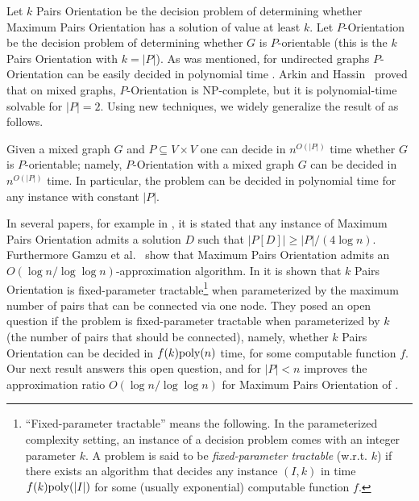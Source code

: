 \documentclass[envcountsame]{llncs}
\begin{document}
\vspace{0.1cm}

Let {\sf $k$ Pairs Orientation} be the decision problem of determining whether 
{\sf Ma\-xi\-mum Pairs Orientation} has a solution of value at least $k$.
Let {\sf $P$-Orientation} be the decision problem of determining whether 
$G$ is $P$-orientable (this is the {\sf $k$ Pairs Orientation} with $k=|P|$).
As was mentioned, for undirected graphs {\sf $P$-Orientation} can be easily decided 
in polynomial time \cite{HM}.
Arkin and Hassin~\cite{H1} proved that on mixed graphs, {\sf $P$-Orientation}
is NP-complete, but it is polynomial-time solvable for $|P|=2$.
Using new techniques, we widely generalize the result of \cite{H1} as follows.

\begin{theorem} \label{t:mix}
Given a mixed graph $G$ and $P \subseteq V \times V$ one can decide in $n^{O(|P|)}$ time
whether $G$ is $P$-orientable;
namely, {\sf $P$-Orientation} with a mixed graph $G$ can be decided in $n^{O(|P|)}$ time.
In particular, the problem can be decided in polynomial time for any instance with constant $|P|$.
\end{theorem}

In several papers, for example in \cite{ZV}, 
it is stated that any instance of {\sf Ma\-xi\-mum Pairs Orientation} 
admits a solution $D$ such that $|P[D]| \geq |P|/(4\log n)$. 
Furthermore Gamzu et al.~\cite{segev-approx} show that
{\sf Maximum Pairs Orientation} admits an $O(\log n/\log\log n)$-approximation algorithm.
In \cite{fpt} it is shown that {\sf $k$ Pairs Orientation} is fixed-parameter 
tractable\footnote{``Fixed-parameter tractable'' means the following. 
In the parameterized complexity setting, an instance of a decision problem 
comes with an integer parameter $k$.
A problem is said to be {\em fixed-parameter tractable} (w.r.t. $k$) if there exists an algorithm 
that decides any instance $(I,k)$ in time $f(k) {\rm poly}(|I|)$ for some (usually exponential) 
computable function $f$.}
when parameterized by the maximum number of pairs that can be connected via one node.
They posed an open question if the problem is fixed-parameter tractable when parameterized by $k$
(the number of pairs that should be connected),
namely, whether {\sf $k$ Pairs Orientation} can be decided in $f(k) {\rm poly}(n)$ time, 
for some computable function $f$.
Our next result answers this open question, and for $|P|<n$ improves the approximation 
ratio $O(\log n/\log\log n)$ for {\sf Maximum Pairs Orientation} of \cite{ZV,segev-approx}. 
\end{document}
